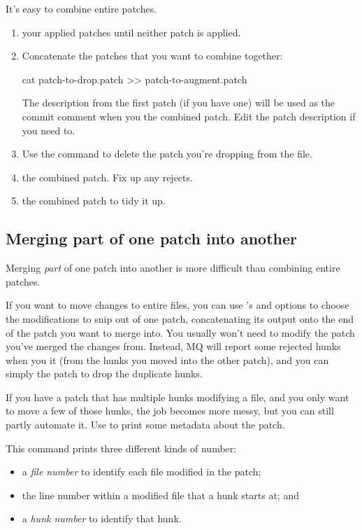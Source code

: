 It's easy to combine entire patches.

\begin{enumerate}
\item {} your applied patches until neither patch is
  applied.
\item Concatenate the patches that you want to combine together:
  \begin{codesample4}
    cat patch-to-drop.patch >> patch-to-augment.patch
  \end{codesample4}
  The description from the first patch (if you have one) will be used
  as the commit comment when you  the combined patch.
  Edit the patch description if you need to.
\item Use the  command to delete the patch you're dropping
  from the  file.
\item {} the combined patch.  Fix up any rejects.
\item {} the combined patch to tidy it up.
\end{enumerate}

\subsection{Merging part of one patch into another}

Merging \emph{part} of one patch into another is more difficult than
combining entire patches.

If you want to move changes to entire files, you can use
's  and
 options to choose the modifications to snip
out of one patch, concatenating its output onto the end of the patch
you want to merge into.  You usually won't need to modify the patch
you've merged the changes from.  Instead, MQ will report some rejected
hunks when you  it (from the hunks you moved into the
other patch), and you can simply  the patch to drop
the duplicate hunks.

If you have a patch that has multiple hunks modifying a file, and you
only want to move a few of those hunks, the job becomes more messy,
but you can still partly automate it.  Use  to
print some metadata about the patch.

This command prints three different kinds of number:
\begin{itemize}
\item a \emph{file number} to identify each file modified in the patch;
\item the line number within a modified file that a hunk starts at; and
\item a \emph{hunk number} to identify that hunk.
\end{itemize}


